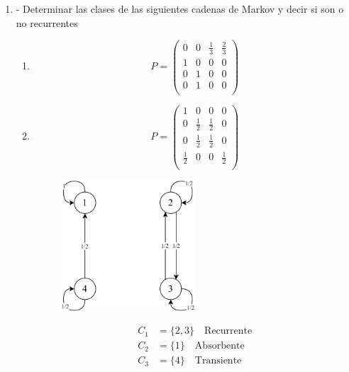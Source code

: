 \documentclass{templateNote}
\begin{document}
\begin{enumerate}[start = 2]
    \newpage
    \item - Determinar las clases de las siguientes cadenas de Markov y decir si son o no recurrentes
    \begin{enumerate}[label=\alph*)]
        \item 
        \[
        P = \begin{pmatrix}
            0 & 0 & \frac{1}{3} & \frac{2}{3} \\
            1 & 0 & 0 & 0 \\
            0 & 1 & 0 & 0 \\
            0 & 1 & 0 & 0 \\
        \end{pmatrix}
        \]
        \item  
        \[
        P = \begin{pmatrix}
            1           & 0           & 0             & 0 \\
            0           & \frac{1}{2} & \frac{1}{2}   & 0 \\
            0           & \frac{1}{2} & \frac{1}{2}   & 0 \\
            \frac{1}{2} & 0           & 0             & \frac{1}{2}\\
        \end{pmatrix}
        \]
        \begin{figure}[H]
            \centering
            \includegraphics[width=0.5\textwidth]{img/ejer6_2.png}
        \end{figure}

        \begin{align*}
            C_1 &= \{2,3\} \quad \text{Recurrente} \\
            C_2 &= \{1\} \quad \text{Absorbente} \\
            C_3 &= \{4\} \quad \text{Transiente} \\
        \end{align*}


\end{enumerate}
\end{enumerate}
\end{document}
